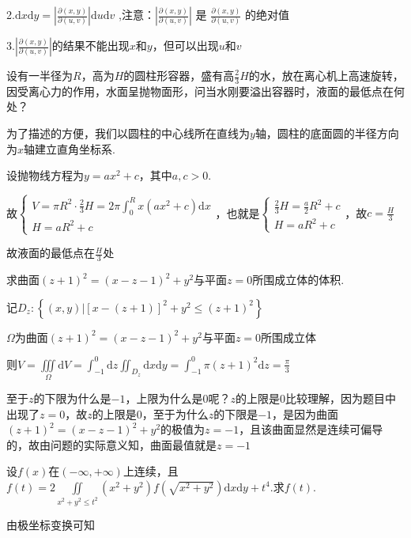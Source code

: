 \begin{xiti}
\begin{solution}
\begin{note}
			2.$ \mathrm{d} x \mathrm{d} y = \left| \frac{\partial(x, y)}{\partial(u, v)} \right| \mathrm{d} u \mathrm{d} v$ ,注意：$\left| \frac{\partial(x, y)}{\partial(u, v)} \right|$ 是 $\frac{\partial(x, y)}{\partial(u, v)}$ 的绝对值
			
			3.$\left| \frac{\partial(x, y)}{\partial(u, v)} \right|$的结果不能出现$x$和$y$，但可以出现$u$和$v$
		\end{note}
	\end{solution}
	\item 设有一半径为$R$，高为$H$的圆柱形容器，盛有高$\frac{2}{3}H$的水，放在离心机上高速旋转，因受离心力的作用，水面呈抛物面形，问当水刚要溢出容器时，液面的最低点在何处？
	\begin{solution}
		为了描述的方便，我们以圆柱的中心线所在直线为$y$轴，圆柱的底面圆的半径方向为$x$轴建立直角坐标系.
		
		设抛物线方程为$y=a x^{2}+c$，其中$a, c>0$.
		
		故$
		\left\{\begin{array}{l}{V=\pi R^{2} \cdot \frac{2}{3} H=2 \pi \int_{0}^{R} x\left(a x^{2}+c\right) \mathrm{d} x} \\ {H=a R^{2}+c}\end{array}\right.
		$，也就是$
		\left\{\begin{array}{l}{\frac{2}{3} H=\frac{a}{2} R^{2}+c} \\ {H=a R^{2}+c}\end{array}\right.
		$，故$c=\frac{H}{3}$
		
		故液面的最低点在$\frac{H}{3}$处
	\end{solution}
	\item 求曲面$(z+1)^{2}=(x-z-1)^{2}+y^{2}$与平面$z=0$所围成立体的体积.
	\begin{solution}
		记$D_{z} :\left\{(x, y) |[x-(z+1)]^{2}+y^{2} \leq(z+1)^{2}\right\}$
		
		$\Omega$为曲面$(z+1)^{2}=(x-z-1)^{2}+y^{2}$与平面$z=0$所围成立体
		
		则$V=\iiint\limits_{\Omega} \mathrm{d} V=\int_{-1}^{0} \mathrm{d} z \iint_{D_{z}} \mathrm{d} x \mathrm{d} y=\int_{-1}^{0} \pi(z+1)^{2} \mathrm{d} z=\frac{\pi}{3}$
		
		\begin{note}
			至于$z$的下限为什么是$-1$，上限为什么是$0$呢？$z$的上限是$0$比较理解，因为题目中出现了$z=0$，故$z$的上限是$0$，至于为什么$z$的下限是$-1$，是因为曲面$(z+1)^{2}=(x-z-1)^{2}+y^{2}$的极值为$z=-1$，且该曲面显然是连续可偏导的，故由问题的实际意义知，曲面最值就是$z=-1$
		\end{note}
	\end{solution}
	\item 设$f(x)$在$(-\infty,+\infty)$上连续，且$f\left(t\right)=2\iint\limits_{x^2+y^2\leq t^2}{\left(x^2+y^2\right)}f\left(\sqrt{x^2+y^2}\right)\textrm{d}x\textrm{d}y+t^4$.求$f(t)$.
	\begin{solution}
		由极坐标变换可知
		

\end{solution}
\end{xiti}
